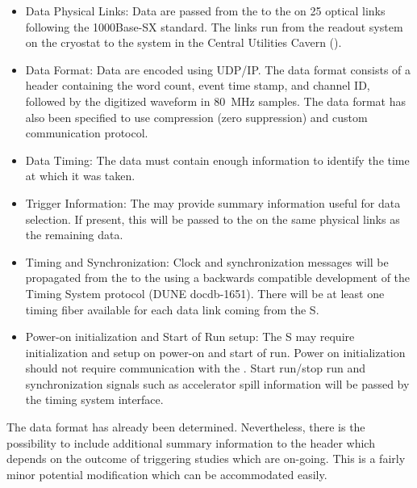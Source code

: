 \begin{itemize}

\item Data Physical Links: Data are passed from the  to the  on 25 optical links following the 1000Base-SX standard. The links run from the  readout system on the cryostat to the  system in the Central Utilities Cavern ().

\item Data Format: Data are encoded using UDP/IP.  The data format consists of a header containing the word count, event time stamp, and channel ID, followed by the digitized waveform in \SI{80}{MHz} samples.
The data format has also been specified to use compression (zero suppression) and custom communication protocol.

\item Data Timing: The data must contain enough information to identify the time at which it was taken.

\item Trigger Information: The  may provide summary information useful for data selection. If present, this will be passed to the  on the same physical links as the remaining data.

\item Timing and Synchronization: Clock and synchronization messages will be propagated from the  to the  using a backwards compatible development of the  Timing System protocol (DUNE docdb-1651). There will be at least one timing fiber available for each data link coming from the S. 

\item Power-on initialization and Start of Run setup:  The S may require initialization and setup on power-on and start of run. Power on initialization should not require communication with the . Start run/stop run and synchronization signals such as accelerator spill information will be passed by the timing system interface.

\end{itemize}

The data format has already been determined. Nevertheless, there is the possibility to include additional summary information to the header which depends on the outcome of triggering studies which are on-going. This is a fairly minor potential modification which can be accommodated easily.

